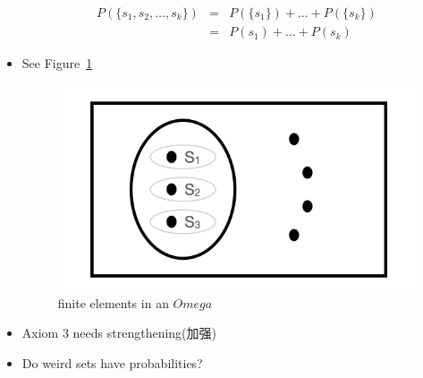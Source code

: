 \begin{itemize}
        \begin{eqnarray*}
            P(\{s_1, s_2, \dots, s_k\}) & = & P(\{s_1\}) + \dots + P(\{s_k\}) \\
            & = & P(s_1) + \dots + P(s_k)
        \end{eqnarray*}

        \item See Figure~\ref{fig:1-7}
        \begin{figure}[h!]
            \centering
            \includegraphics[scale=0.7]{images/1-7}
            \caption{finite elements in an $Omega$}
            \label{fig:1-7}
        \end{figure}


        \item Axiom 3 needs strengthening(加强)
        \item Do weird sets have probabilities?
        
    \end{itemize}

